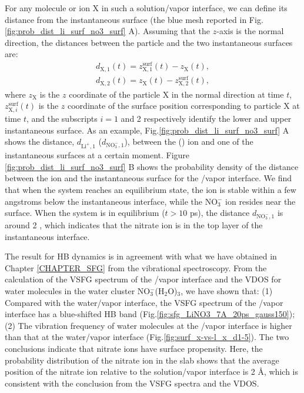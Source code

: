 For any molecule or ion X in such a solution/vapor interface, we can define its distance from the instantaneous surface 
(the blue mesh reported in Fig.\thinspace\ref{fig:prob_dist_li_surf_no3_surf} A).
Assuming that the $z$-axis is the normal direction, the distances between the particle and the two instantaneous surfaces are:
%
\begin{eqnarray}
    d_{\text{X},1}(t)=  z^\text{surf}_{\text{X},1}(t) - z_{\text{X}}(t),\label{eq:distance_particle2surf_1}\\
    d_{\text{X},2}(t)= z_{\text{X}}(t) - z^\text{surf}_{\text{X},2}(t), 
\label{eq:distance_particle2surf_2}
\end{eqnarray}
%
where $z_{\text{X}}$ is the $z$ coordinate of the particle X in the normal direction at time $t$, 
$z^\text{surf}_{\text{X},i}(t)$ is the $z$ coordinate of the surface position corresponding to particle X at time $t$, 
and the subscripts $i=1$ and 2 respectively identify the lower and upper instantaneous surface.
As an example, Fig.\thinspace\ref{fig:prob_dist_li_surf_no3_surf} A shows the distance, 
$d_{\text{Li}^+,1}$ ($d_{\text{NO}_3^-,1}$), between the \Li (\nitrate) ion and one of the instantaneous surfaces at a certain moment.
Figure \thinspace\ref{fig:prob_dist_li_surf_no3_surf} B shows the probability density of the distance between the ion 
and the instantaneous surface for the \LiN/vapor interface. We find that when the system reaches an equilibrium state, 
the \Li ion is stable within a few angstroms below the instantaneous interface, while the NO$^-_3$ ion resides near the surface. 
When the system is in equilibrium ($t>10$ ps), the distance $d_{\text{NO}_3^-,1}$ is around 2 \A, 
which indicates that the nitrate ion is in the top layer of the instantaneous interface. 

The result for HB dynamics is in agreement with what we have obtained in Chapter \ref{CHAPTER_SFG}  
from the vibrational spectroscopy.
From the calculation of the VSFG spectrum of the \LiN/vapor interface and the VDOS for water molecules in the water cluster NO$^-_3$(H$_2$O)$_3$,
we have shown that: (1) Compared with the water/vapor interface, the VSFG spectrum of the \LiN/vapor interface has a blue-shifted HB band 
(Fig.\thinspace\ref{fig:sfg_LiNO3_7A_20ps_gauss150});
(2) The vibration frequency of water molecules at the \LiN/vapor interface is higher than that at the water/vapor interface (Fig.\thinspace\ref{fig:surf_x-vs-l_x_d1-5}).
The two conclusions indicate that nitrate ions have surface propensity. 
Here, the probability distribution of the nitrate ion in the slab shows that the average position of the nitrate ion relative to the solution/vapor interface is 2 \AA,
which is consistent with the conclusion from the VSFG spectra and the VDOS.
%
